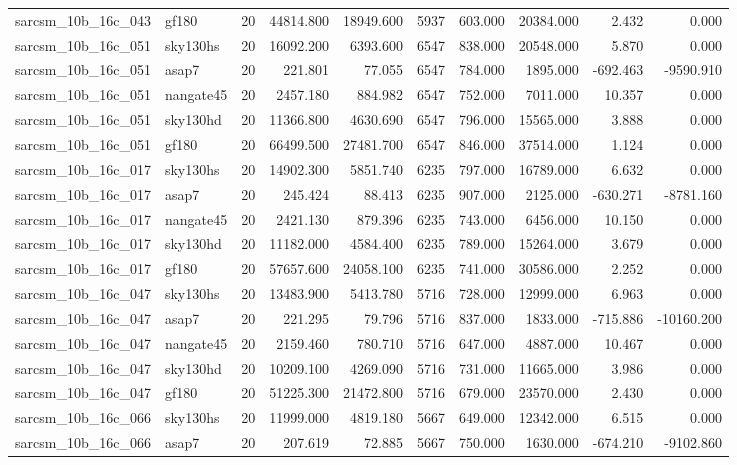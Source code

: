\documentclass{article}
\begin{document}
\begin{longtable}{llrrrrrrrr}
sarcsm\_10b\_16c\_043 & gf180 & 20 & 44814.800 & 18949.600 & 5937 & 603.000 & 20384.000 & 2.432 & 0.000 \\
sarcsm\_10b\_16c\_051 & sky130hs & 20 & 16092.200 & 6393.600 & 6547 & 838.000 & 20548.000 & 5.870 & 0.000 \\
sarcsm\_10b\_16c\_051 & asap7 & 20 & 221.801 & 77.055 & 6547 & 784.000 & 1895.000 & -692.463 & -9590.910 \\
sarcsm\_10b\_16c\_051 & nangate45 & 20 & 2457.180 & 884.982 & 6547 & 752.000 & 7011.000 & 10.357 & 0.000 \\
sarcsm\_10b\_16c\_051 & sky130hd & 20 & 11366.800 & 4630.690 & 6547 & 796.000 & 15565.000 & 3.888 & 0.000 \\
sarcsm\_10b\_16c\_051 & gf180 & 20 & 66499.500 & 27481.700 & 6547 & 846.000 & 37514.000 & 1.124 & 0.000 \\
sarcsm\_10b\_16c\_017 & sky130hs & 20 & 14902.300 & 5851.740 & 6235 & 797.000 & 16789.000 & 6.632 & 0.000 \\
sarcsm\_10b\_16c\_017 & asap7 & 20 & 245.424 & 88.413 & 6235 & 907.000 & 2125.000 & -630.271 & -8781.160 \\
sarcsm\_10b\_16c\_017 & nangate45 & 20 & 2421.130 & 879.396 & 6235 & 743.000 & 6456.000 & 10.150 & 0.000 \\
sarcsm\_10b\_16c\_017 & sky130hd & 20 & 11182.000 & 4584.400 & 6235 & 789.000 & 15264.000 & 3.679 & 0.000 \\
sarcsm\_10b\_16c\_017 & gf180 & 20 & 57657.600 & 24058.100 & 6235 & 741.000 & 30586.000 & 2.252 & 0.000 \\
sarcsm\_10b\_16c\_047 & sky130hs & 20 & 13483.900 & 5413.780 & 5716 & 728.000 & 12999.000 & 6.963 & 0.000 \\
sarcsm\_10b\_16c\_047 & asap7 & 20 & 221.295 & 79.796 & 5716 & 837.000 & 1833.000 & -715.886 & -10160.200 \\
sarcsm\_10b\_16c\_047 & nangate45 & 20 & 2159.460 & 780.710 & 5716 & 647.000 & 4887.000 & 10.467 & 0.000 \\
sarcsm\_10b\_16c\_047 & sky130hd & 20 & 10209.100 & 4269.090 & 5716 & 731.000 & 11665.000 & 3.986 & 0.000 \\
sarcsm\_10b\_16c\_047 & gf180 & 20 & 51225.300 & 21472.800 & 5716 & 679.000 & 23570.000 & 2.430 & 0.000 \\
sarcsm\_10b\_16c\_066 & sky130hs & 20 & 11999.000 & 4819.180 & 5667 & 649.000 & 12342.000 & 6.515 & 0.000 \\
sarcsm\_10b\_16c\_066 & asap7 & 20 & 207.619 & 72.885 & 5667 & 750.000 & 1630.000 & -674.210 & -9102.860 \\

\end{longtable}
\end{document}
